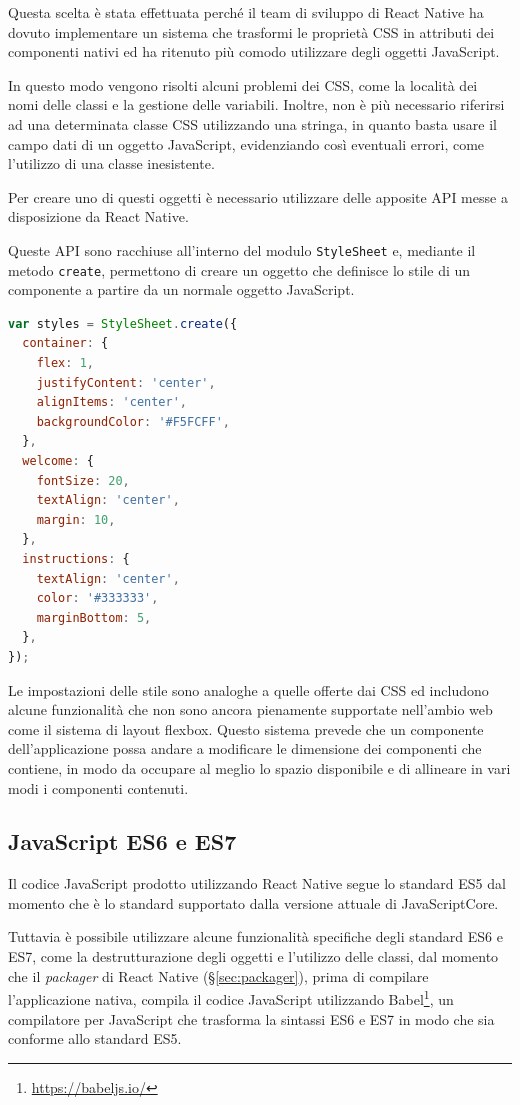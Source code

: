 Questa scelta è stata effettuata perché il team di sviluppo di React Native ha dovuto implementare un sistema che trasformi le proprietà CSS in attributi dei componenti nativi ed ha ritenuto più comodo utilizzare degli oggetti JavaScript.

In questo modo vengono risolti alcuni problemi dei CSS, come la località dei nomi delle classi e la gestione delle variabili.
Inoltre, non è più necessario riferirsi ad una determinata classe CSS utilizzando una stringa, in quanto basta usare il campo dati di un oggetto JavaScript, evidenziando così eventuali errori, come l'utilizzo di una classe inesistente.

Per creare uno di questi oggetti è necessario utilizzare delle apposite API messe a disposizione da React Native.

Queste API sono racchiuse all'interno del modulo \texttt{StyleSheet} e, mediante il metodo \texttt{create}, permettono di creare un oggetto che definisce lo stile di un componente a partire da un normale oggetto JavaScript.

\begin{lstlisting}[language=JavaScript, caption=Esempio della definizione dello stile di un componente di React Native]
var styles = StyleSheet.create({
  container: {
    flex: 1,
    justifyContent: 'center',
    alignItems: 'center',
    backgroundColor: '#F5FCFF',
  },
  welcome: {
    fontSize: 20,
    textAlign: 'center',
    margin: 10,
  },
  instructions: {
    textAlign: 'center',
    color: '#333333',
    marginBottom: 5,
  },
});
\end{lstlisting}

Le impostazioni delle stile sono analoghe a quelle offerte dai CSS ed includono alcune funzionalità che non sono ancora pienamente supportate nell'ambio web come il sistema di layout flexbox.
Questo sistema prevede che un componente dell'applicazione possa andare a modificare le dimensione dei componenti che contiene, in modo da occupare al meglio lo spazio disponibile e di allineare in vari modi i componenti contenuti.

\subsection{JavaScript ES6 e ES7}

Il codice JavaScript prodotto utilizzando React Native segue lo standard ES5 dal momento che è lo standard supportato dalla versione attuale di JavaScriptCore.

Tuttavia è possibile utilizzare alcune funzionalità specifiche degli standard ES6 e ES7, come la destrutturazione degli oggetti e l'utilizzo delle classi, dal momento che il \textit{packager} di React Native (§\ref{sec:packager}), prima di compilare l'applicazione nativa, compila il codice JavaScript utilizzando Babel\footnote{\url{https://babeljs.io/}}, un compilatore per JavaScript che trasforma la sintassi ES6 e ES7 in modo che sia conforme allo standard ES5.

